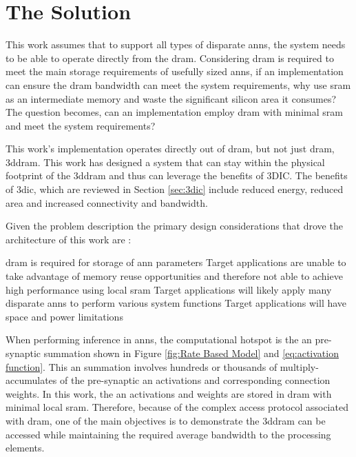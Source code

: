 
\section[The Solution]{The Solution}
\label{sec:The Solution}

This work assumes that to support all types of disparate \ac{ann}s, the system needs to be able to operate directly from the \ac{dram}.
Considering \ac{dram} is required to meet the main storage requirements of usefully sized \ac{ann}s, if an implementation can ensure the \ac{dram} bandwidth can meet the system requirements, why use \ac{sram} as an intermediate memory and waste the significant silicon area it consumes?
The question becomes, can an implementation employ \ac{dram} with minimal \ac{sram} and meet the system requirements?

This work's implementation operates directly out of \ac{dram}, but not just \ac{dram}, \ac{3ddram}.
This work has designed a system that can stay within the physical footprint of the \ac{3ddram} and thus can leverage the benefits of 3DIC.
The benefits of \ac{3dic}, which are reviewed in Section \ref{sec:3dic} include reduced energy, reduced area and increased connectivity and bandwidth.

\iffalse
Therefore, this work is able to propose a custom 3D-\ac{dram} that exposes more of the \ac{dram}s internal page and thus generates interface bandwidth that is on the order of 64 times that of the standard \ac{3ddram}.
\fi

Given the problem description \iffalse outlined in Section \ref{sec:The Problem},\fi the primary design considerations that drove the architecture of this work are :
\begin{outline}
  \1 \ac{dram} is required for storage of \ac{ann} parameters 
  \1 Target applications are unable to take advantage of memory reuse opportunities and therefore not able to achieve high performance using local \ac{sram} \iffalse to store \ac{ann} parameters or the \ac{ann} input \fi
  \1 Target applications will likely apply many disparate \acp{ann} to perform various system functions
  \1 Target applications will have space and power limitations
\end{outline}

When performing inference in \acp{ann}, the computational hotspot is the \ac{an} pre-synaptic summation shown in Figure \ref{fig:Rate Based Model} and \eqref{eq:activation function}.
This \ac{an} summation involves hundreds or thousands of multiply-accumulates of the pre-synaptic \ac{an} activations and corresponding connection weights. 
In this work, the \ac{an} activations and weights are stored in \ac{dram} with minimal local \ac{sram}. 
Therefore, because of the complex access protocol associated with \ac{dram}, one of the main objectives is to demonstrate the \ac{3ddram} can be accessed while maintaining the required average bandwidth to the processing elements.
\iffalse with relatively high levels of bus efficiency. \fi

